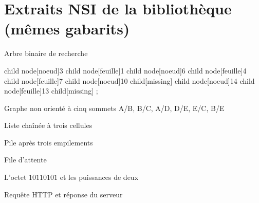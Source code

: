 \documentclass{gabarits/nexus-manuel-v5}
\begin{document}
\begin{cdpSix}
\end{cdpSix}

\section*{\textcolor{rubMethodes}{Extraits NSI de la bibliothèque (mêmes gabarits)}}

\begin{nxfigure}{Arbre binaire de recherche}
  \begin{nxarbre}
      child { node[noeud]{3}
        child { node[feuille]{1} }
        child { node[noeud]{6}
          child { node[feuille]{4} }
          child { node[feuille]{7} } } }
      child { node[noeud]{10}
        child[missing]
        child { node[noeud]{14}
          child { node[feuille]{13} }
          child[missing] } };
  \end{nxarbre}
\end{nxfigure}

\begin{nxfigure}{Graphe non orienté à cinq sommets}
    {A/B, B/C, A/D, D/E, E/C, B/E}
\end{nxfigure}

\begin{nxfigure}{Liste chaînée à trois cellules}
\end{nxfigure}

\begin{nxfigure}{Pile après trois empilements}
\end{nxfigure}

\begin{nxfigure}{File d'attente}
\end{nxfigure}

\begin{nxfigure}{L'octet $10110101$ et les puissances de deux}
\end{nxfigure}

\begin{nxfigure}{Requête HTTP et réponse du serveur}
\end{nxfigure}
\end{document}
